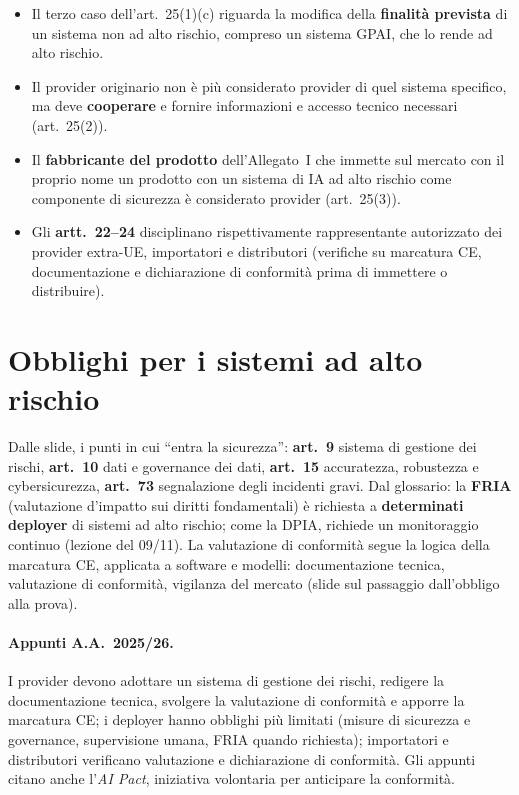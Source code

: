 \begin{integrazione}
\begin{itemize}
  \item Il terzo caso dell'art.~25(1)(c) riguarda la modifica della \textbf{finalità prevista} di un
    sistema non ad alto rischio, compreso un sistema GPAI, che lo rende ad alto rischio.
  \item Il provider originario non è più considerato provider di quel sistema specifico, ma deve
    \textbf{cooperare} e fornire informazioni e accesso tecnico necessari (art.~25(2)).
  \item Il \textbf{fabbricante del prodotto} dell'Allegato~I che immette sul mercato con il proprio nome
    un prodotto con un sistema di IA ad alto rischio come componente di sicurezza è considerato provider
    (art.~25(3)).
  \item Gli \textbf{artt.~22--24} disciplinano rispettivamente rappresentante autorizzato dei provider
    extra-UE, importatori e distributori (verifiche su marcatura CE, documentazione e dichiarazione di
    conformità prima di immettere o distribuire).
\end{itemize}
\end{integrazione}

\section{Obblighi per i sistemi ad alto rischio}
\label{sec:aiact-obblighi}

Dalle slide, i punti in cui ``entra la sicurezza'': \textbf{art.~9} sistema di gestione dei rischi,
\textbf{art.~10} dati e governance dei dati, \textbf{art.~15} accuratezza, robustezza e cybersicurezza,
\textbf{art.~73} segnalazione degli incidenti gravi. Dal glossario: la \textbf{FRIA} (valutazione
d'impatto sui diritti fondamentali) è richiesta a \textbf{determinati deployer} di sistemi ad alto
rischio; come la DPIA, richiede un monitoraggio continuo (lezione del 09/11). La valutazione di
conformità segue la logica della marcatura CE, applicata a software e modelli: documentazione tecnica,
valutazione di conformità, vigilanza del mercato (slide sul passaggio dall'obbligo alla prova).

\paragraph{Appunti A.A.~2025/26.} I provider devono adottare un sistema di gestione dei rischi, redigere
la documentazione tecnica, svolgere la valutazione di conformità e apporre la marcatura CE; i deployer
hanno obblighi più limitati (misure di sicurezza e governance, supervisione umana, FRIA quando
richiesta); importatori e distributori verificano valutazione e dichiarazione di conformità. Gli
appunti citano anche l'\emph{AI Pact}, iniziativa volontaria per anticipare la conformità.

